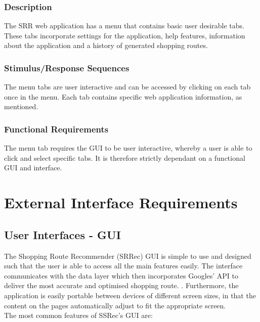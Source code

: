 \documentclass[10pt, a4paper, onecolumn]{scrartcl}
\begin{document}
			\subsubsection{Description}
			
				The SRR web application has a menu that contains basic user desirable tabs. These tabs incorporate settings for the application, help features, information about the application and a history of generated shopping routes. 
			
			\subsubsection{Stimulus/Response Sequences}
			
				The menu tabs are user interactive and can be accessed by clicking on each tab once in the menu. Each tab contains specific web application information, as mentioned. 
			
			\subsubsection{Functional Requirements}
			
				The menu tab requires the GUI to be user interactive, whereby a user is able to click and select specific tabs. It is therefore strictly dependant on a functional GUI and interface.
				
	
	\section{External Interface Requirements}
	
		\subsection{User Interfaces - GUI}
		
				The Shopping Route Recommender (SRRec) GUI is simple to use and designed such that the user is able to access all the main features easily. The interface communicates with the data layer which then incorporates Googles' API to deliver the most accurate and optimised shopping route. . Furthermore, the application is easily portable between devices of different screen sizes, in that the content on the pages automatically adjust to fit the appropriate screen.\\
				
				The most common features of SSRec's GUI are:
				
\end{document}
